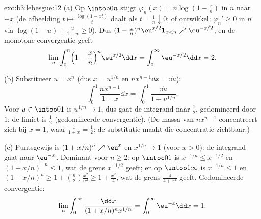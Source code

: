\begin{solution}{exo:b3:lebesgue:12}
(a) Op $\intoo0n$ stijgt $\varphi_n(x) = n\log(1 - \frac xn)$ in
$n$ naar $-x$ (de afbeelding $t \mapsto \frac{\log(1 - xt)}{t}$
daalt als $t = \frac1n \downarrow 0$; of ontwikkel: $\varphi_{n}'
\geq 0$ in $n$ via $\log(1-u) + \frac{u}{1-u} \geq 0$). Dus $(1 -
\frac xn)^n\eu^{x/2}\mathbf 1_{x<n} \nearrow \eu^{-x/2}$, en de
monotone convergentie geeft
\[
\lim_n\int_0^n\Bigl(1 - \frac xn\Bigr)^n\eu^{x/2}\dd x =
\int_0^\infty\eu^{-x/2}\dd x = 2 .
\]

(b) Substitueer $u = x^n$ (dus $x = u^{1/n}$ en $n x^{n-1}\dd x =
\dd u$):
\[
\int_0^1\frac{nx^{n-1}}{1 + x}\dd x =
\int_0^1\frac{\dd u}{1 + u^{1/n}} .
\]
Voor $u \in \intoo01$ is $u^{1/n} \to 1$, dus gaat de integrand
naar $\frac12$, gedomineerd door $1$: de limiet is $\frac12$
(gedomineerde convergentie). (De massa van $nx^{n-1}$ concentreert
zich bij $x = 1$, waar $\frac1{1+x} = \frac12$: de substitutie
maakt die concentratie zichtbaar.)

(c) Puntsgewijs is $(1 + x/n)^n \nearrow \eu^x$ en $x^{1/n} \to 1$
(voor $x > 0$): de integrand gaat naar $\eu^{-x}$. Dominant voor
$n \geq 2$: op $\intoc01$ is $x^{-1/n} \leq x^{-1/2}$ en $(1 +
x/n)^{-n} \leq 1$, wat de  grens $x^{-1/2}$ geeft; en
op $\intoo1\infty$ is $x^{-1/n} \leq 1$ en $(1 + x/n)^n \geq 1 +
\binom n2\frac{x^2}{n^2} \geq 1 + \frac{x^2}4$, wat de
 grens $\frac{4}{4 + x^2}$ geeft. Gedomineerde
convergentie:
\[
\lim_n\int_0^\infty\frac{\dd x}{(1 + x/n)^nx^{1/n}} =
\int_0^\infty\eu^{-x}\dd x = 1 .
\]
\end{solution}

